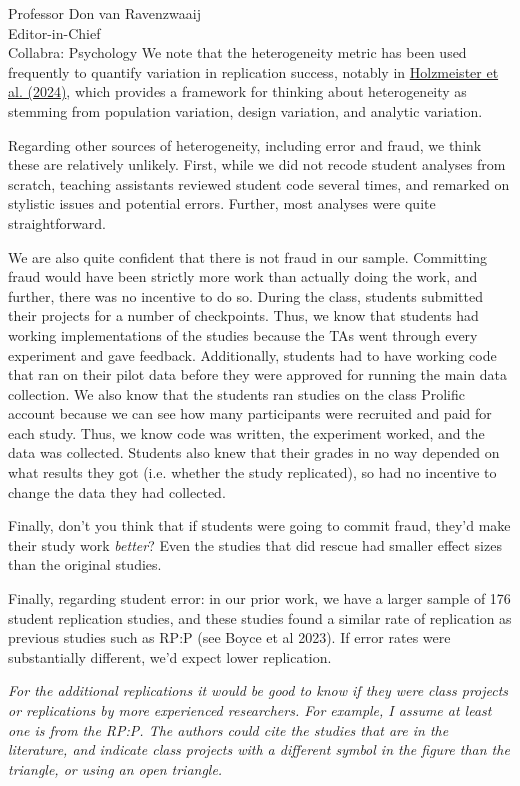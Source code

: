 \documentclass{stanfordletter}
\newcommand{\theysaid}[1]{\begin{leftbar} \noindent 
		\textsl{ #1}\end{leftbar}}
\begin{document}
\begin{letter}{Professor Don van Ravenzwaaij \\ Editor-in-Chief \\ Collabra: Psychology }
	We note that the heterogeneity metric has been used frequently to quantify variation in replication success, notably in \href{doi.org/10.1073/pnas.2403490121}{Holzmeister et al. (2024)}, which provides a framework for thinking about heterogeneity as stemming from population variation, design variation, and analytic variation. 
	
	Regarding other sources of heterogeneity, including error and fraud, we think these are relatively unlikely.  First, while we did not recode student analyses from scratch, teaching assistants reviewed student code several times, and remarked on stylistic issues and potential errors. Further, most analyses were quite straightforward.
	
	We are also quite confident that there is not fraud in our sample. Committing fraud would have been strictly more work than actually doing the work, and further, there was no incentive to do so. During the class, students submitted their projects for a number of checkpoints. Thus, we know that students had working implementations of the studies because the TAs went through every experiment and gave feedback. Additionally, students had to have working code that ran on their pilot data before they were approved for running the main data collection. We also know that the students ran studies on the class Prolific account because we can see how many participants were recruited and paid for each study. Thus, we know code was written, the experiment worked, and the data was collected. Students also knew that their grades in no way depended on what results they got (i.e. whether the study replicated), so had no incentive to change the data they had collected. 
	
	Finally, don't you think that if students were going to commit fraud, they'd make their study work \emph{better}? Even the studies that did rescue had smaller effect sizes than the original studies. 
	
	Finally, regarding student error: in our prior work, we have a larger sample of 176 student replication studies, and these studies found a similar rate of replication as previous studies such as RP:P (see Boyce et al 2023). If error rates were substantially different, we'd expect lower replication.
	
	\theysaid{For the additional replications it would be good to know if they were class projects or replications by more experienced researchers. For example, I assume at least one is from the RP:P. The authors could cite the studies that are in the literature, and indicate class projects with a different symbol in the figure than the triangle, or using an open triangle. }
	

\end{letter}
\end{document}
